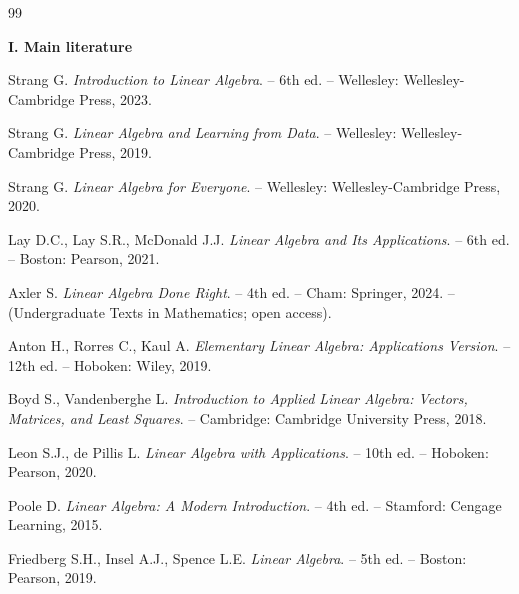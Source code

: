 \begingroup
{}
\newcommand{\adabguruh}[1]{\par\vskip 0pt plus 6\baselineskip\penalty-200
  \vskip 0pt plus -6\baselineskip\item[]\hspace*{-\labelwidth}\hspace*{-\labelsep}%
  \textbf{#1}\par\nopagebreak}
\begin{thebibliography}{99}
\markboth{\bibname}{\bibname}

\adabguruh{I. Main literature}

Strang G. \textit{Introduction to Linear Algebra}. – 6th ed. –
Wellesley: Wellesley-Cambridge Press, 2023.

Strang G. \textit{Linear Algebra and Learning from Data}. – Wellesley:
Wellesley-Cambridge Press, 2019.

Strang G. \textit{Linear Algebra for Everyone}. – Wellesley:
Wellesley-Cambridge Press, 2020.

Lay D.C., Lay S.R., McDonald J.J. \textit{Linear Algebra and Its Applications}. –
6th ed. – Boston: Pearson, 2021.

Axler S. \textit{Linear Algebra Done Right}. – 4th ed. – Cham: Springer,
2024. – (Undergraduate Texts in Mathematics; open access).

Anton H., Rorres C., Kaul A. \textit{Elementary Linear Algebra: Applications
Version}. – 12th ed. – Hoboken: Wiley, 2019.

Boyd S., Vandenberghe L. \textit{Introduction to Applied Linear Algebra:
Vectors, Matrices, and Least Squares}. – Cambridge: Cambridge University
Press, 2018.

Leon S.J., de Pillis L. \textit{Linear Algebra with Applications}. –
10th ed. – Hoboken: Pearson, 2020.

Poole D. \textit{Linear Algebra: A Modern Introduction}. – 4th ed. –
Stamford: Cengage Learning, 2015.

Friedberg S.H., Insel A.J., Spence L.E. \textit{Linear Algebra}. – 5th ed. –
Boston: Pearson, 2019.


\end{thebibliography}
